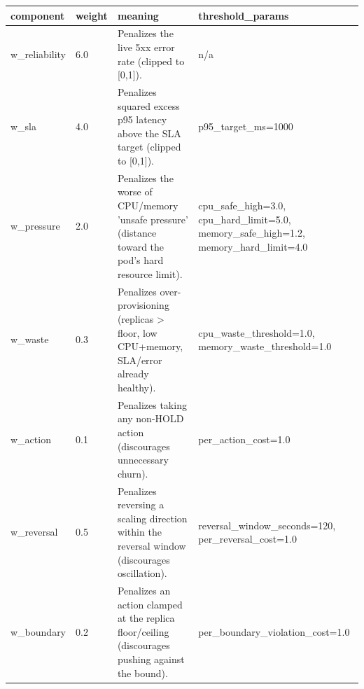 \begin{tabular}{llll}
\hline
component & weight & meaning & threshold\_params \\
\hline
w\_reliability & 6.0 & Penalizes the live 5xx error rate (clipped to [0,1]). & n/a \\
w\_sla & 4.0 & Penalizes squared excess p95 latency above the SLA target (clipped to [0,1]). & p95\_target\_ms=1000 \\
w\_pressure & 2.0 & Penalizes the worse of CPU/memory 'unsafe pressure' (distance toward the pod's hard resource limit). & cpu\_safe\_high=3.0, cpu\_hard\_limit=5.0, memory\_safe\_high=1.2, memory\_hard\_limit=4.0 \\
w\_waste & 0.3 & Penalizes over-provisioning (replicas > floor, low CPU+memory, SLA/error already healthy). & cpu\_waste\_threshold=1.0, memory\_waste\_threshold=1.0 \\
w\_action & 0.1 & Penalizes taking any non-HOLD action (discourages unnecessary churn). & per\_action\_cost=1.0 \\
w\_reversal & 0.5 & Penalizes reversing a scaling direction within the reversal window (discourages oscillation). & reversal\_window\_seconds=120, per\_reversal\_cost=1.0 \\
w\_boundary & 0.2 & Penalizes an action clamped at the replica floor/ceiling (discourages pushing against the bound). & per\_boundary\_violation\_cost=1.0 \\
\hline
\end{tabular}

